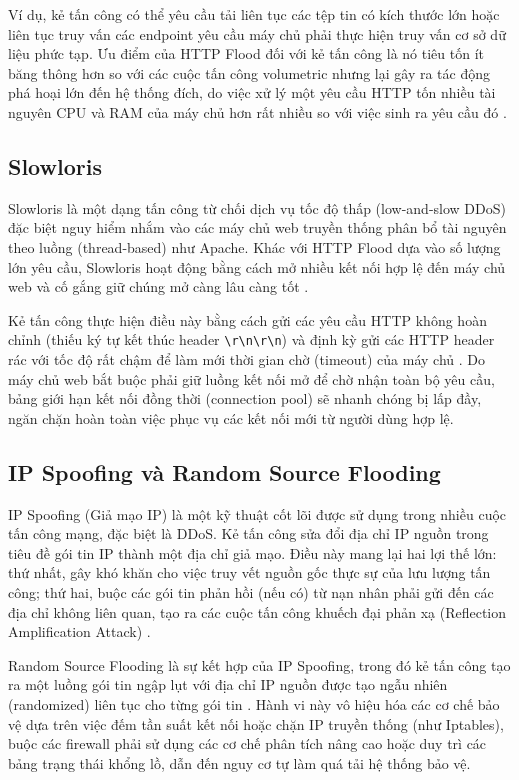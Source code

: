 \documentclass[../DoAn.tex]{subfiles}
\begin{document}
Ví dụ, kẻ tấn công có thể yêu cầu tải liên tục các tệp tin có kích thước lớn hoặc liên tục truy vấn các endpoint yêu cầu máy chủ phải thực hiện truy vấn cơ sở dữ liệu phức tạp. Ưu điểm của HTTP Flood đối với kẻ tấn công là nó tiêu tốn ít băng thông hơn so với các cuộc tấn công volumetric nhưng lại gây ra tác động phá hoại lớn đến hệ thống đích, do việc xử lý một yêu cầu HTTP tốn nhiều tài nguyên CPU và RAM của máy chủ hơn rất nhiều so với việc sinh ra yêu cầu đó \cite{cambiaso2013slow}.

\subsection{Slowloris}
Slowloris là một dạng tấn công từ chối dịch vụ tốc độ thấp (low-and-slow DDoS) đặc biệt nguy hiểm nhắm vào các máy chủ web truyền thống phân bổ tài nguyên theo luồng (thread-based) như Apache. Khác với HTTP Flood dựa vào số lượng lớn yêu cầu, Slowloris hoạt động bằng cách mở nhiều kết nối hợp lệ đến máy chủ web và cố gắng giữ chúng mở càng lâu càng tốt \cite{cambiaso2013slow}.

Kẻ tấn công thực hiện điều này bằng cách gửi các yêu cầu HTTP không hoàn chỉnh (thiếu ký tự kết thúc header \verb|\r\n\r\n|) và định kỳ gửi các HTTP header rác với tốc độ rất chậm để làm mới thời gian chờ (timeout) của máy chủ \cite{cambiaso2013slow}. Do máy chủ web bắt buộc phải giữ luồng kết nối mở để chờ nhận toàn bộ yêu cầu, bảng giới hạn kết nối đồng thời (connection pool) sẽ nhanh chóng bị lấp đầy, ngăn chặn hoàn toàn việc phục vụ các kết nối mới từ người dùng hợp lệ.

\subsection{IP Spoofing và Random Source Flooding}
IP Spoofing (Giả mạo IP) là một kỹ thuật cốt lõi được sử dụng trong nhiều cuộc tấn công mạng, đặc biệt là DDoS. Kẻ tấn công sửa đổi địa chỉ IP nguồn trong tiêu đề gói tin IP thành một địa chỉ giả mạo. Điều này mang lại hai lợi thế lớn: thứ nhất, gây khó khăn cho việc truy vết nguồn gốc thực sự của lưu lượng tấn công; thứ hai, buộc các gói tin phản hồi (nếu có) từ nạn nhân phải gửi đến các địa chỉ không liên quan, tạo ra các cuộc tấn công khuếch đại phản xạ (Reflection Amplification Attack) \cite{mirkovic2004taxonomy}.

Random Source Flooding là sự kết hợp của IP Spoofing, trong đó kẻ tấn công tạo ra một luồng gói tin ngập lụt với địa chỉ IP nguồn được tạo ngẫu nhiên (randomized) liên tục cho từng gói tin \cite{mirkovic2004taxonomy}. Hành vi này vô hiệu hóa các cơ chế bảo vệ dựa trên việc đếm tần suất kết nối hoặc chặn IP truyền thống (như Iptables), buộc các firewall phải sử dụng các cơ chế phân tích nâng cao hoặc duy trì các bảng trạng thái khổng lồ, dẫn đến nguy cơ tự làm quá tải hệ thống bảo vệ.
\end{document}
